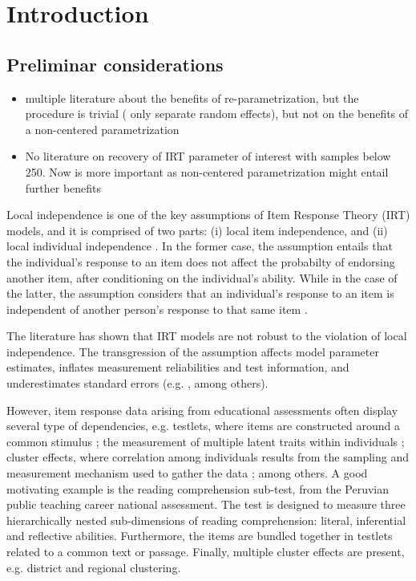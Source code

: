 \chapter{Introduction}

\section{Preliminar considerations}

\begin{itemize}
	\item multiple literature about the benefits of re-parametrization, but the procedure is trivial ( only separate random effects), but not on the benefits of a non-centered parametrization
	\item No literature on recovery of IRT parameter of interest with samples below 250. Now is more important as non-centered parametrization might entail further benefits
\end{itemize}


Local independence is one of the key assumptions of Item Response Theory (IRT) models, and it is comprised of two parts: (i) local item independence, and (ii) local individual independence \cite{Baker_2001, Hambleton_et_al_1991a}. In the former case, the assumption entails that the individual's response to an item does not affect the probabilty of endorsing another item, after conditioning on the individual's ability. While in the case of the latter, the assumption considers that an individual's response to an item is independent of another person's response to that same item \cite{Reckase_2009}. 

The literature has shown that IRT models are not robust to the violation of local independence. The transgression of the assumption affects model parameter estimates, inflates measurement reliabilities and test information, and underestimates standard errors (e.g. \citet{Yen_1984, Chen_et_al_1997, Jiao_et_al_2012}, among others). 

However, item response data arising from educational assessments often display several type of dependencies, e.g. testlets, where items are constructed around a common stimulus \cite{Wainer_et_al_2007}; the measurement of multiple latent traits within individuals \cite{Reckase_2009}; cluster effects, where correlation among individuals results from the sampling and measurement mechanism used to gather the data \cite{Raudenbush_et_al_2002}; among others. A good motivating example is the reading comprehension sub-test, from the Peruvian public teaching career national assessment. The test is designed to measure three hierarchically nested sub-dimensions of reading comprehension: literal, inferential and reflective abilities. Furthermore, the items are bundled together in testlets related to a common text or passage. Finally, multiple cluster effects are present, e.g. district and regional clustering.

